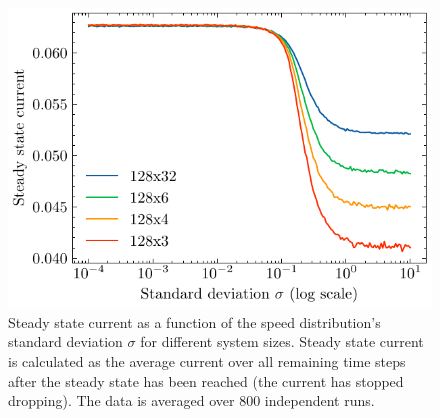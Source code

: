\begin{figure}[H]
    \centering
    \includegraphics{steady_state_current_sizes_log.pdf}
    \caption{Steady state current as a function of the speed distribution's standard deviation $\sigma$ for different system sizes. Steady state current is calculated as the average current over all remaining time steps after the steady state has been reached (the current has stopped dropping). The data is averaged over 800 independent runs.}
    \label{fig:steady_state_current_sizes_log}
\end{figure}

